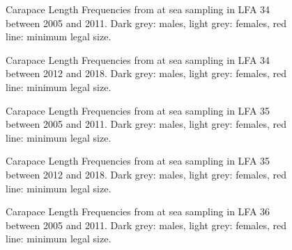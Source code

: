 \documentclass[11pt]{article}
\newcommand{\e}{\string~/bio.data/bio.lobster/figures/} %
\newcommand{\ebh}{\string~/bio.data/bio.lobster/figures/LFA3438Framework2019/} %
\begin{document}


    \begin{figure}
    \centering
        \caption{Carapace Length Frequencies from at sea sampling in LFA 34 between 2005 and 2011. Dark grey: males, light grey: females, red line: minimum legal size.}

    \end{figure}

   \begin{figure}
    \centering
        \caption{Carapace Length Frequencies from at sea sampling in LFA 34 between 2012 and 2018. Dark grey: males, light grey: females, red line: minimum legal size.}

    \end{figure}

    \begin{figure}
    \centering
        \caption{Carapace Length Frequencies from at sea sampling in LFA 35 between 2005 and 2011. Dark grey: males, light grey: females, red line: minimum legal size.}

    \end{figure}

   \begin{figure}
    \centering
        \caption{Carapace Length Frequencies from at sea sampling in LFA 35 between 2012 and 2018. Dark grey: males, light grey: females, red line: minimum legal size.}

    \end{figure}

   \begin{figure}
    \centering
        \caption{Carapace Length Frequencies from at sea sampling in LFA 36 between 2005 and 2011. Dark grey: males, light grey: females, red line: minimum legal size.}

    \end{figure}
\end{document}
